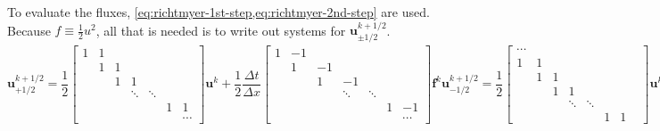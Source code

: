 To evaluate the fluxes, \cref{eq:richtmyer-1st-step,eq:richtmyer-2nd-step} are used.
Because $f\equiv \frac{1}{2}u^2$, all that is needed is to write out systems for $\mathbf{u}_{\pm 1/2}^{k+1/2}$.
\begin{subequations}
    \begin{equation}
        \label{eq:u1/2-system}
        \mathbf{{u}}_{+1/2}^{k+1/2}=\frac{1}{2}
        \begin{bmatrix}
            1 & 1 &   &        &        &   &        \\
            & 1 & 1 &        &        &   &        \\
            &   & 1 & 1      &        &   &        \\
            &   &   & \ddots & \ddots &   &        \\
            &   &   &        &        & 1 & 1      \\
            &   &   &        &        &   & \cdots
        \end{bmatrix}\mathbf{u}^k+\frac{1}{2}\frac{\Delta t}{\Delta x}
        \begin{bmatrix}
            1 & -1 &    &        &        &   &        \\
            & 1  & -1 &        &        &   &        \\
            &    & 1  & -1     &        &   &        \\
            &    &    & \ddots & \ddots &   &        \\
            &    &    &        &        & 1 & -1     \\
            &    &    &        &        &   & \cdots
        \end{bmatrix}\mathbf{f}^k
    \end{equation}
    \begin{equation}
        \label{eq:u-1/2-system}
        \mathbf{{u}}_{-1/2}^{k+1/2}=\frac{1}{2}
        \begin{bmatrix}
            \cdots &   &   &   & & & & \\
            1      & 1 &   &   & & & & \\
            & 1 & 1 &   & & & & \\
            &   & 1 & 1 & & & & \\
            & & & \ddots & \ddots & & \\
            & & & & & 1 & 1

        \end{bmatrix}\mathbf{u}^k+\frac{1}{2}\frac{\Delta t}{\Delta x}
        \begin{bmatrix}
            \cdots &    &    &        &        &    \\
            1      & -1 &    &        &        &    \\
            & 1  & -1 &        &        &    \\
            &    & 1  & -1     &        &    \\
            &    &    & \ddots & \ddots &    \\
            &    &    &        & 1      & -1 \\


\end{bmatrix}
\end{equation}
\end{subequations}
